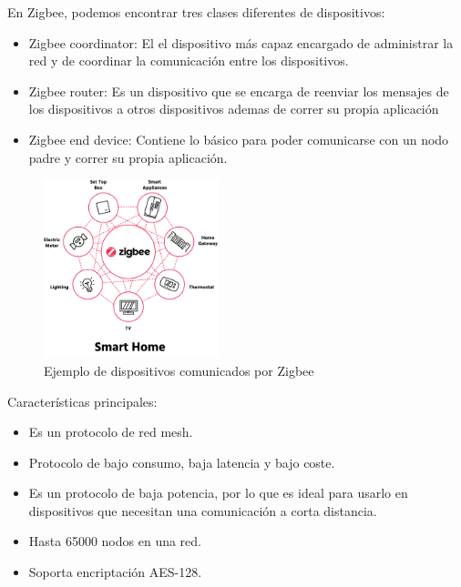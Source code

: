 \begin{titlepage}
En Zigbee, podemos encontrar tres clases diferentes de dispositivos:
\begin{itemize}
	\item Zigbee coordinator: El el dispositivo más capaz encargado de administrar la red y de coordinar la comunicación entre los dispositivos.
	\item Zigbee router: Es un dispositivo que se encarga de reenviar los mensajes de los dispositivos a otros dispositivos ademas de correr su propia aplicación
	\item Zigbee end device: Contiene lo básico para poder comunicarse con un nodo padre y correr su propia aplicación.
\end{itemize}
\begin{figure}[h!]
	\centering
	\includegraphics[width=0.45\textwidth]{imagenes/zigbee.png}
	\caption{Ejemplo de dispositivos comunicados por Zigbee\cite{zigbee_img}}
\end{figure}
Características principales:
\begin{itemize}
	\item Es un protocolo de red mesh.
	\item Protocolo de bajo consumo, baja latencia y bajo coste.
	\item Es un protocolo de baja potencia, por lo que es ideal para usarlo en dispositivos que necesitan una comunicación a corta distancia.
	\item Hasta 65000 nodos en una red.
	\item Soporta encriptación AES-128.
\end{itemize}
\end{titlepage}
